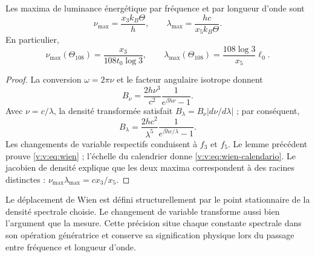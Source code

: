 \begin{proposition}
\label{v:v:prop:wien}
Les maxima de luminance énergétique par fréquence et par longueur d’onde sont
\begin{equation}
 \nu_{\max}=\frac{x_3 k_B\Theta}{h},\qquad
 \lambda_{\max}=\frac{hc}{x_5 k_B\Theta}.
 \label{v:v:eq:wien}
\end{equation}
En particulier,
\begin{equation}
 \nu_{\max}(\Theta_{108})=
 \frac{x_3}{108t_0\log3},\qquad
 \lambda_{\max}(\Theta_{108})=
 \frac{108\log3}{x_5}\ell_0.
 \label{v:v:eq:wien-calendario}
\end{equation}
\end{proposition}
\begin{proof}
La conversion \(\omega=2\pi\nu\) et le facteur angulaire isotrope donnent
\[
 B_\nu=\frac{2h\nu^3}{c^2}\frac1{e^{\beta h\nu}-1}.
\]
Avec \(\nu=c/\lambda\), la densité transformée satisfait
\(B_\lambda=B_\nu|d\nu/d\lambda|\) ; par conséquent,
\[
 B_\lambda=\frac{2hc^2}{\lambda^5}
 \frac1{e^{\beta hc/\lambda}-1}.
\]
Les changements de variable respectifs conduisent à \(f_3\) et \(f_5\).
Le lemme précédent prouve \eqref{v:v:eq:wien} ; l’échelle du calendrier
donne \eqref{v:v:eq:wien-calendario}. Le jacobien de densité explique que
les deux maxima correspondent à des racines distinctes :
\(\nu_{\max}\lambda_{\max}=c x_3/x_5\).
\end{proof}

Le déplacement de Wien est défini structurellement par le point
stationnaire de la densité spectrale choisie. Le changement de variable
transforme aussi bien l’argument que la mesure. Cette précision situe
chaque constante spectrale dans son opération génératrice et conserve sa
signification physique lors du passage entre fréquence et longueur d’onde.
